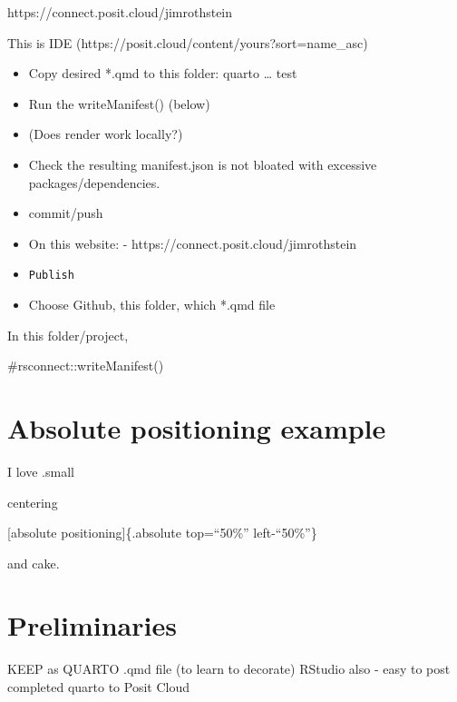 \documentclass[
]{report}
\newenvironment{Shaded}{\begin{snugshade}}{\end{snugshade}}
\newcommand{\CommentTok}[1]{\textcolor[rgb]{0.37,0.37,0.37}{#1}}
\begin{document}
https://connect.posit.cloud/jimrothstein

This is IDE (https://posit.cloud/content/yours?sort=name\_asc)

\begin{itemize}
\item
  Copy desired *.qmd to this folder: quarto \ldots{} test
\item
  Run the writeManifest() (below)
\item
  (Does render work locally?)
\item
  Check the resulting manifest.json is not bloated with excessive
  packages/dependencies.
\item
  commit/push
\item
  On this website: - https://connect.posit.cloud/jimrothstein
\item
  \texttt{Publish}
\item
  Choose Github, this folder, which *.qmd file
\end{itemize}

In this folder/project,

\begin{Shaded}
\begin{Highlighting}[]
\CommentTok{\#rsconnect::writeManifest()}
\end{Highlighting}
\end{Shaded}

\section{Absolute positioning
example}\label{absolute-positioning-example}

{I love .small}

{centering}

{[}absolute positioning{]}\{.absolute top=``50\%'' left-``50\%''\}

{and cake.}

\section{Preliminaries}\label{preliminaries}

\begin{tcolorbox}[enhanced jigsaw, arc=.35mm, bottomrule=.15mm, breakable, colback=white, colframe=quarto-callout-color-frame, left=2mm, leftrule=.75mm, opacityback=0, rightrule=.15mm, toprule=.15mm]

KEEP as QUARTO .qmd file (to learn to decorate) RStudio also - easy to
post completed quarto to Posit Cloud

\end{tcolorbox}
\end{document}
